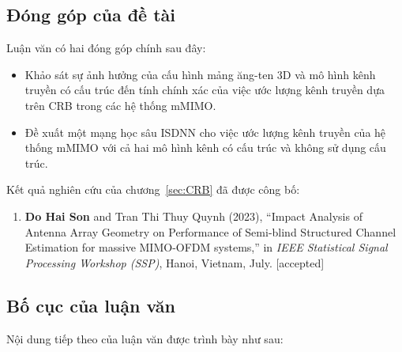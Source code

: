 \subsection*{Đóng góp của đề tài}

Luận văn có hai đóng góp chính sau đây:
\renewcommand{\labelitemi}{$-$}
\begin{itemize}
    \item Khảo sát sự ảnh hưởng của cấu hình mảng ăng-ten 3D và mô hình kênh truyền có cấu trúc đến tính chính xác của việc ước lượng kênh truyền dựa trên CRB trong các hệ thống mMIMO.
    
	\item Đề xuất một mạng học sâu ISDNN cho việc ước lượng kênh truyền của hệ thống mMIMO với cả hai mô hình kênh có cấu trúc và không sử dụng cấu trúc.
\end{itemize} 

Kết quả nghiên cứu của chương~\ref{sec:CRB} đã được công bố:
\begin{enumerate}
    \item[] \textbf{Do Hai Son} and Tran Thi Thuy Quynh (2023), ``Impact Analysis of Antenna Array Geometry on Performance of Semi-blind Structured Channel Estimation for massive MIMO-OFDM systems,'' in \textit{IEEE Statistical Signal Processing Workshop (SSP)}, Hanoi, Vietnam, July. [accepted]
\end{enumerate}


\subsection*{Bố cục của luận văn}
\vspace{0.5cm}

Nội dung tiếp theo của luận văn được trình bày như sau:

